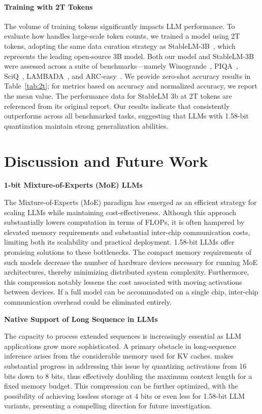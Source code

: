\paragraph{Training with 2T Tokens}

The volume of training tokens significantly impacts LLM performance. To evaluate how  handles large-scale token counts, we trained a  model using 2T tokens, adopting the same data curation strategy as StableLM-3B~\cite{StableLM-3B-4E1T}, which represents the leading open-source 3B model. Both our model and StableLM-3B were assessed across a suite of benchmarks—namely Winogrande~\cite{winoGrande}, PIQA~\cite{piqa}, SciQ~\cite{sciq}, LAMBADA~\cite{lambada}, and ARC-easy~\cite{arc}. We provide zero-shot accuracy results in Table~\ref{tab:2t}; for metrics based on accuracy and normalized accuracy, we report the mean value. The performance data for StableLM 3b at 2T tokens are referenced from its original report. Our results indicate that  consistently outperforms across all benchmarked tasks, suggesting that LLMs with 1.58-bit quantization maintain strong generalization abilities.

\section{Discussion and Future Work}

\textbf{1-bit Mixture-of-Experts (MoE) LLMs}

The Mixture-of-Experts (MoE) paradigm has emerged as an efficient strategy for scaling LLMs while maintaining cost-effectiveness. Although this approach substantially lowers computation in terms of FLOPs, it is often hampered by elevated memory requirements and substantial inter-chip communication costs, limiting both its scalability and practical deployment. 1.58-bit LLMs offer promising solutions to these bottlenecks. The compact memory requirements of such models decrease the number of hardware devices necessary for running MoE architectures, thereby minimizing distributed system complexity. Furthermore, this compression notably lessens the cost associated with moving activations between devices. If a full model can be accommodated on a single chip, inter-chip communication overhead could be eliminated entirely.

\textbf{Native Support of Long Sequence in LLMs}

The capacity to process extended sequences is increasingly essential as LLM applications grow more sophisticated. A primary obstacle in long-sequence inference arises from the considerable memory used for KV caches.  makes substantial progress in addressing this issue by quantizing activations from 16 bits down to 8 bits, thus effectively doubling the maximum context length for a fixed memory budget. This compression can be further optimized, with the possibility of achieving lossless storage at 4 bits or even less for 1.58-bit LLM variants, presenting a compelling direction for future investigation.

